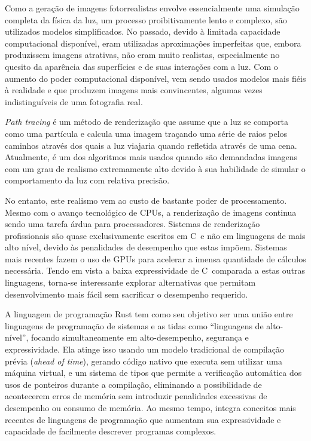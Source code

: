 \documentclass[tg]{mdtufsm}
\def\Cpp{{C\nolinebreak[4]\raisebox{.20ex}{\small\bf++}}}
\begin{document}
Como a geração de imagens fotorrealistas envolve essencialmente uma simulação completa da física da
luz, um processo proibitivamente lento e complexo, são utilizados modelos simplificados. No
passado, devido à limitada capacidade computacional disponível, eram utilizadas aproximações
imperfeitas que, embora produzissem imagens atrativas, não eram muito realistas, especialmente no
quesito da aparência das superfícies e de suas interações com a luz. Com o aumento do poder
computacional disponível, vem sendo usados modelos mais fiéis à realidade e que produzem imagens
mais convincentes, algumas vezes indistinguíveis de uma fotografia real.

\emph{Path tracing} é um método de renderização que assume que a luz se comporta como uma partícula
e calcula uma imagem traçando uma série de raios pelos caminhos através dos quais a luz viajaria quando
refletida através de uma cena. Atualmente, é um dos algoritmos mais usados quando são demandadas
imagens com um grau de realismo extremamente alto devido à sua habilidade de simular o
comportamento da luz com relativa precisão. \citep{pharr2010}

No entanto, este realismo vem ao custo de bastante poder de processamento. Mesmo com o avanço
tecnológico de CPUs, a renderização de imagens continua sendo uma tarefa árdua para processadores.
Sistemas de renderização profissionais são quase exclusivamente escritos em \Cpp\ e não em
linguagens de mais alto nível, devido às penalidades de desempenho que estas impõem. Sistemas mais
recentes fazem o uso de GPUs para acelerar a imensa quantidade de cálculos necessária.
Tendo em vista a baixa expressividade de \Cpp\ comparada a estas outras linguagens, torna-se
interessante explorar alternativas que permitam desenvolvimento mais fácil sem sacrificar o
desempenho requerido.

A linguagem de programação Rust \citep{rust} tem como
seu objetivo ser uma união entre linguagens de programação de sistemas e as tidas como ``linguagens
de alto-nível'', focando simultaneamente em alto-desempenho, segurança e expressividade. Ela atinge
isso usando um modelo tradicional de compilação prévia (\emph{ahead of time}), gerando código nativo que executa
sem utilizar uma máquina virtual, e um sistema de tipos
que permite a verificação automática dos usos de ponteiros durante a compilação, eliminando a
possibilidade de acontecerem erros de memória sem introduzir penalidades excessivas de desempenho
ou consumo de memória. Ao mesmo tempo, integra conceitos mais recentes de linguagens de programação
que aumentam sua expressividade e capacidade de facilmente descrever programas complexos.
\end{document}
